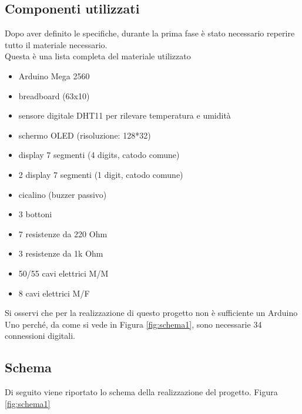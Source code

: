 \documentclass[paper=a4, fontsize=10pt]{scrartcl}
\begin{document}
\subsection{Componenti utilizzati}
Dopo aver definito le specifiche, durante la prima fase è stato necessario reperire tutto il materiale necessario.\\
Questa è una lista completa del materiale utilizzato
\begin{itemize}
\item Arduino Mega 2560
\item breadboard (63x10)
\item sensore digitale DHT11 per rilevare temperatura e umidità
\item schermo OLED (risoluzione: 128*32)
\item display 7 segmenti (4 digits, catodo comune)
\item 2 display 7 segmenti (1 digit, catodo comune)
\item cicalino (buzzer passivo)
\item 3 bottoni
\item 7 resistenze da 220 Ohm
\item 3 resistenze da 1k Ohm
\item 50/55 cavi elettrici M/M
\item 8 cavi elettrici M/F
\end{itemize}

Si osservi che per la realizzazione di questo progetto non è sufficiente un Arduino Uno perché, da come si vede in Figura \ref{fig:schema1}, sono necessarie 34 connessioni digitali.
\subsection{Schema}
Di seguito viene riportato lo schema della realizzazione del progetto.
Figura \ref{fig:schema1}
\end{document}
